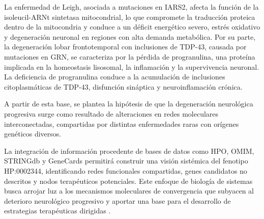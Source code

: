 La enfermedad de Leigh, asociada a mutaciones en IARS2, afecta la función de la isoleucil-ARNt sintetasa mitocondrial, lo que compromete la traducción proteica dentro de la mitocondria y conduce a un déficit energético severo, estrés oxidativo y degeneración neuronal en regiones con alta demanda metabólica.
Por su parte, la degeneración lobar frontotemporal con inclusiones de TDP-43, causada por mutaciones en GRN, se caracteriza por la pérdida de progranulina, una proteína implicada en la homeostasis lisosomal, la inflamación y la supervivencia neuronal. La deficiencia de progranulina conduce a la acumulación de inclusiones citoplasmáticas de TDP-43, disfunción sináptica y neuroinflamación crónica.

A partir de esta base, se plantea la hipótesis de que la degeneración neurológica progresiva surge como resultado de alteraciones en redes moleculares interconectadas, compartidas por distintas enfermedades raras con orígenes genéticos diversos. 

La integración de información procedente de bases de datos como HPO, OMIM, STRINGdb y GeneCards permitirá construir una visión sistémica del fenotipo HP:0002344, identificando redes funcionales compartidas, genes candidatos no descritos y nodos terapéuticos potenciales. Este enfoque de biología de sistemas busca arrojar luz a los mecanismos moleculares de convergencia que subyacen al deterioro neurológico progresivo y aportar una base para el desarrollo de estrategias terapéuticas dirigidas \cite{HPO2025,Ehrhart2016_Rett_MECP2_pathways,Dong2024_IARS2_Leigh} .